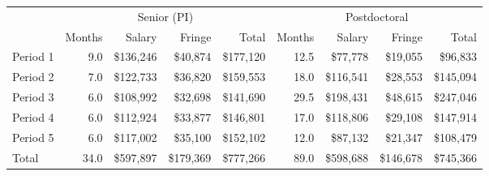\begin{tabular}{lrrrr|rrrr}
\hline
 & \multicolumn{4}{c|}{Senior (PI)} & \multicolumn{4}{c}{Postdoctoral} \\
{} & Months & Salary & Fringe &  Total & Months & Salary & Fringe & Total \\
\hline
Period 1 &       9.0 &  \$136,246 &   \$40,874 &  \$177,120 &           12.5 &        \$77,778 &        \$19,055 &       \$96,833 \\
Period 2 &       7.0 &  \$122,733 &   \$36,820 &  \$159,553 &           18.0 &       \$116,541 &        \$28,553 &      \$145,094 \\
Period 3 &       6.0 &  \$108,992 &   \$32,698 &  \$141,690 &           29.5 &       \$198,431 &        \$48,615 &      \$247,046 \\
Period 4 &       6.0 &  \$112,924 &   \$33,877 &  \$146,801 &           17.0 &       \$118,806 &        \$29,108 &      \$147,914 \\
Period 5 &       6.0 &  \$117,002 &   \$35,100 &  \$152,102 &           12.0 &        \$87,132 &        \$21,347 &      \$108,479 \\
\hline
Total    &      34.0 &  \$597,897 &  \$179,369 &  \$777,266 &           89.0 &       \$598,688 &       \$146,678 &      \$745,366 \\
\hline
\end{tabular}
